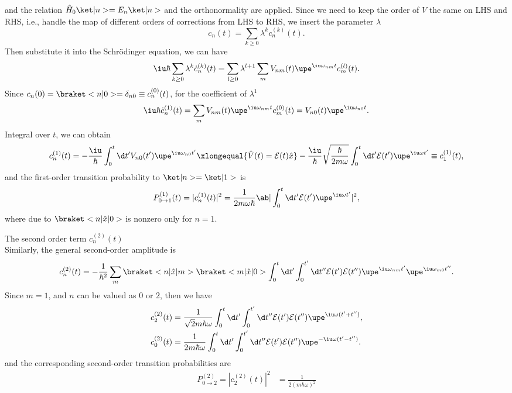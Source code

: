 \begin{solution}
\begin{enumext}
\begin{enumext}
      and the relation $\hat H_0\ket|n> = E_n\ket|n>$ and the orthonormality are applied.
      Since we need to keep the order of $V$ the same on LHS and RHS,
      i.e., handle the map of different orders of corrections from LHS to RHS,
      we insert the parameter $\lambda$
      \[
        c_n(t) = \sum_{k\geq0} \lambda^k c_n^{(k)}(t).
      \]
      Then substitute it into the Schr\"odinger equation, we can have
      \[
        \iu\hbar \sum_{k\geq0} \lambda^k \dot c_n^{(k)}(t)
      = \sum_{l\geq0} \lambda^{l+1} \sum_m V_{nm}(t) \upe^{\iu\omega_{nm}t} c_m^{(l)}(t).
      \]
      Since $c_n(0) = \braket<n|0> = \delta_{n0} \equiv c_n^{(0)}(t)$, for the coefficient of $\lambda^1$
      \[
        \iu\hbar \dot c_n^{(1)}(t) = \sum_m V_{nm}(t) \upe^{\iu\omega_{nm}t} c_m^{(0)}(t)
      = V_{n0}(t) \upe^{\iu\omega_{n0}t}.
      \]
      Integral over $t$, we can obtain
      \[
        c_n^{(1)}(t) = -\frac\iu\hbar \int_0^t \d t' V_{n0}(t') \upe^{\iu\omega_{n0}t'}
      \xlongequal{\hat V(t) = \mathcal E(t) \hat x}
        -\frac\iu\hbar \sqrt{\frac\hbar{2m\omega}} \int_0^{t} \d t' \mathcal E(t') \upe^{\iu\omega t'}
      \equiv c_1^{(1)}(t),
      \]
      and the first-order transition probability to $\ket|n> = \ket|1>$ is
      \[
        P_{0\to1}^{(1)}(t) = |c_n^{(1)}(t)|^2 = \frac1{2m\omega\hbar}
        \ab|\int_0^t \d t' \mathcal E(t') \upe^{\iu\omega t'}|^2,
      \]
      where due to $\braket<n|\hat x|0>$ is nonzero only for $n = 1$.
      \item The second order term $c_n^{(2)}(t)$\\
      Similarly, the general second-order amplitude is
      \[
        c_n^{(2)}(t) = -\frac1{\hbar^2} \sum_m \braket<n|\hat x|m> \braket<m|\hat x|0>
        \int_0^t \d t' \int_0^{t'} \d t'' \mathcal E(t') \mathcal E(t'')
        \upe^{\iu\omega_{nm}t'} \upe^{\iu\omega_{m0}t''}.
      \]
      Since $m = 1$, and $n$ can be valued as $0$ or $2$, then we have
      \begin{align*}
        c_2^{(2)}(t) & = \frac1{\sqrt2m\hbar\omega} \int_0^t \d t' \int_0^{t'} \d t''
        \mathcal E(t') \mathcal E(t'') \upe^{\iu\omega(t'+t'')},\\
        c_0^{(2)}(t) & = \frac1{2m\hbar\omega} \int_0^t \d t' \int_0^{t'} \d t''
        \mathcal E(t') \mathcal E(t'') \upe^{-\iu\omega(t'-t'')}.
      \end{align*}
      and the corresponding second-order transition probabilities are
      \begin{align*}
        P_{0\to2}^{(2)} = |c_2^{(2)}(t)|^2 & = \frac1{2(m\hbar\omega)^2}

\end{align*}
\end{enumext}
\end{enumext}
\end{solution}
